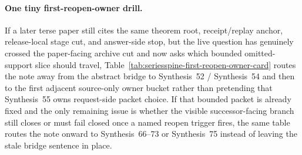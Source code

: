 \documentclass[11pt]{article}
\begin{document}
\paragraph{One tiny first-reopen-owner drill.}
If a later terse paper still cites the same theorem root, receipt/replay anchor, release-local stage cut, and answer-side stop, but the live question has genuinely crossed the paper-facing archive cut and now asks which bounded omitted-support slice should travel, Table~\ref{tab:seriesspine-first-reopen-owner-card} routes the note away from the abstract bridge to Synthesis~52 / Synthesis~54 and then to the first adjacent source-only owner bucket rather than pretending that Synthesis~55 owns request-side packet choice. If that bounded packet is already fixed and the only remaining issue is whether the visible successor-facing branch still closes or must fail closed once a named reopen trigger fires, the same table routes the note onward to Synthesis~66--73 or Synthesis~75 instead of leaving the stale bridge sentence in place.\cite{series:answerdisclosurepackets,series:challengeanswerreviewmenus,series:publicrequestresponsepackets,series:publicrequestresponsepacketcarryforward,series:publicrequestresponsepacketrefreshresponsepacketclosureverdicts,series:pairedterminalcutoverrules}
\end{document}
